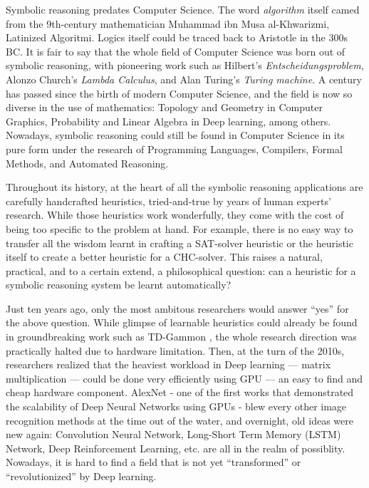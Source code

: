 Symbolic reasoning predates Computer Science. The word \emph{algorithm} itself camed from the 9th-century mathematician Muhammad ibn Musa al-Khwarizmi, Latinized Algoritmi. Logics itself could be traced back to Aristotle in the 300s BC. It is fair to say that the whole field of Computer Science was born out of symbolic reasoning, with pioneering work such as Hilbert's \emph{Entscheidungsproblem}, Alonzo Church's \emph{Lambda Calculus}, and Alan Turing's \emph{Turing machine}.
A century has passed since the birth of modern Computer Science, and the field is now so diverse in the use of mathematics: Topology and Geometry in Computer Graphics, Probability and Linear Algebra in Deep learning, among others.
Nowadays, symbolic reasoning could still be found in Computer Science in its pure form under the research of Programming Languages, Compilers, Formal Methods, and Automated Reasoning. 

Throughout its history, at the heart of all the symbolic reasoning applications are carefully handcrafted heuristics, tried-and-true by years of human experts' research. While those heuristics work wonderfully, they come with the cost of being too specific to the problem at hand. For example, there is no easy way to transfer all the wisdom learnt in crafting a SAT-solver heuristic or the heuristic itself to create a better heuristic for a CHC-solver. This raises a natural, practical, and to a certain extend, a philosophical question: can a heuristic for a symbolic reasoning system be learnt automatically?

Just ten years ago, only the most ambitous researchers would answer ``yes'' for the above question. While glimpse of learnable heuristics could already be found in groundbreaking work such as TD-Gammon \cite{td-gammon}, the whole research direction was practically halted due to hardware limitation. Then, at the turn of the 2010s, researchers realized that the heaviest workload in Deep learning --- matrix multiplication --- could be done very efficiently using GPU --- an easy to find and cheap hardware component. AlexNet \cite{Krizhevsky:nips12} - one of the first works that demonstrated the scalability of Deep Neural Networks using GPUs - blew every other image recognition methods at the time out of the water, and overnight, old ideas were new again: Convolution Neural Network, Long-Short Term Memory (LSTM) Network, Deep Reinforcement Learning, etc. are all in the realm of possiblity. Nowadays, it is hard to find a field that is not yet ``transformed'' or ``revolutionized'' by Deep learning.

